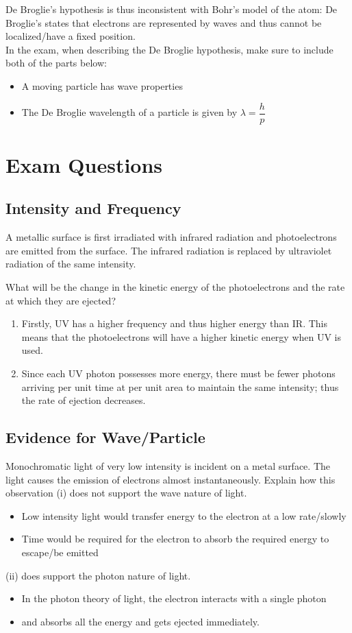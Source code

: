 \documentclass[a4paper,12pt]{article}
\let\oldsection\section
\renewcommand\section{\clearpage\oldsection}
\newcommand{\lb}{\\[8pt]}
\begin{document}
De Broglie's hypothesis is thus inconsistent with Bohr's model of the atom: De Broglie's states that electrons are represented by waves and thus cannot be localized/have a fixed position.\lb
In the exam, when describing the De Broglie hypothesis, make sure to include both of the parts below:
\begin{itemize}
  \item A moving particle has wave properties
  \item The De Broglie wavelength of a particle is given by $\lambda = \dfrac{h}{p}$
\end{itemize}

\section{Exam Questions}

\subsection{Intensity and Frequency}

A metallic surface is first irradiated with infrared radiation and photoelectrons are emitted from the surface. The infrared radiation is replaced by ultraviolet radiation of the same intensity.

What will be the change in the kinetic energy of the photoelectrons and the rate at which they are ejected?
\begin{enumerate}
  \item Firstly, UV has a higher frequency and thus higher energy than IR. This means that the photoelectrons will have a higher kinetic energy when UV is used.
  \item Since each UV photon possesses more energy, there must be fewer photons arriving per unit time at per unit area to maintain the same intensity; thus the rate of ejection decreases.
\end{enumerate}

\pagebreak

\subsection{Evidence for Wave/Particle}

Monochromatic light of very low intensity is incident on a metal surface. The light causes the emission of electrons almost instantaneously. Explain how this observation
(i) does not support the wave nature of light.
\begin{itemize}
  \item Low intensity light would transfer energy to the electron at a low rate/slowly
  \item Time would be required for the electron to absorb the required energy to escape/be emitted
\end{itemize}
(ii) does support the photon nature of light.
\begin{itemize}
  \item In the photon theory of light, the electron interacts with a single photon
  \item and absorbs all the energy and gets ejected immediately.
\end{itemize}
\end{document}
